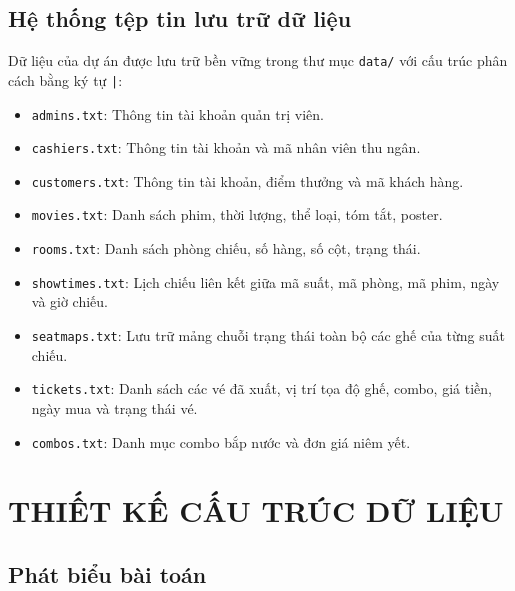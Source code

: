 \documentclass[12pt,a4paper]{article}
\begin{document}
\subsection{Hệ thống tệp tin lưu trữ dữ liệu}
Dữ liệu của dự án được lưu trữ bền vững trong thư mục \texttt{data/} với cấu trúc phân cách bằng ký tự \texttt{|}:
\begin{itemize}
    \item \texttt{admins.txt}: Thông tin tài khoản quản trị viên.
    \item \texttt{cashiers.txt}: Thông tin tài khoản và mã nhân viên thu ngân.
    \item \texttt{customers.txt}: Thông tin tài khoản, điểm thưởng và mã khách hàng.
    \item \texttt{movies.txt}: Danh sách phim, thời lượng, thể loại, tóm tắt, poster.
    \item \texttt{rooms.txt}: Danh sách phòng chiếu, số hàng, số cột, trạng thái.
    \item \texttt{showtimes.txt}: Lịch chiếu liên kết giữa mã suất, mã phòng, mã phim, ngày và giờ chiếu.
    \item \texttt{seatmaps.txt}: Lưu trữ mảng chuỗi trạng thái toàn bộ các ghế của từng suất chiếu.
    \item \texttt{tickets.txt}: Danh sách các vé đã xuất, vị trí tọa độ ghế, combo, giá tiền, ngày mua và trạng thái vé.
    \item \texttt{combos.txt}: Danh mục combo bắp nước và đơn giá niêm yết.
\end{itemize}

\section{THIẾT KẾ CẤU TRÚC DỮ LIỆU}

\subsection{Phát biểu bài toán}
\end{document}
